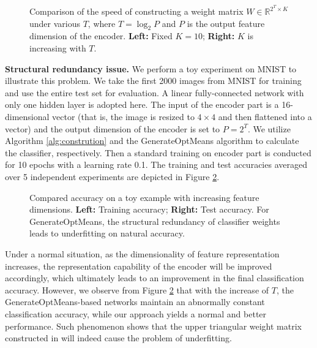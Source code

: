 \documentclass[preprint,review,12pt]{elsarticle}
\numberwithin{equation}{section}
\begin{document}
\begin{figure}[htb]
	\centering
	\caption{
	Comparison of the  speed of constructing a weight matrix $W \in \mathbb{R}^{2^T \times K}$ under various $ T $,
    where $T=\log_2 P$ and $ P $ is the output feature dimension of the encoder.
	\textbf{Left:}  Fixed $K=10$;
	\textbf{Right:} $ K $ is increasing with $ T $.
	}
	\label{fig-genTime}
\end{figure}

\textbf{Structural redundancy issue.} We perform a toy experiment on MNIST to illustrate this problem.
We take the first 2000 images from MNIST for training and use the entire test set for evaluation.
A linear fully-connected network with only one hidden layer is adopted here.
The input of the encoder part is a 16-dimensional vector (that is, the image is resized to $4 \times 4 $ and then flattened into a vector)
and the output dimension of the encoder is set to $ P=2^T $.
We utilize Algorithm \ref{alg:constrution} and the GenerateOptMeans algorithm \cite{pang2018}
to calculate the classifier, respectively.
Then a standard training  on encoder part is conducted for 10 epochs with a learning rate 0.1.
The training and test accuracies averaged over 5 independent experiments are depicted  in Figure \ref{STRed}.

\begin{figure}[htb]
	\centering
	\caption{Compared accuracy on a toy example with increasing feature dimensions.
                 \textbf{Left:} Training accuracy; \textbf{Right:} Test accuracy.
                 For GenerateOptMeans, the structural redundancy of classifier weights leads to underfitting on natural accuracy.
              }
	\label{STRed}
\end{figure}



Under a normal situation,
as the dimensionality of feature representation increases,
the representation capability of the encoder will be improved accordingly,
which ultimately leads to an improvement in the final classification accuracy.
However, we observe from Figure \ref{STRed} that  with the increase of  $ T $,
the GenerateOptMeans-based networks maintain an abnormally constant classification accuracy,
while our approach yields a normal and better performance.
Such phenomenon shows that the upper triangular weight matrix constructed in \cite{pang2018,pang2020}
will indeed cause the problem of underfitting.
\end{document}
